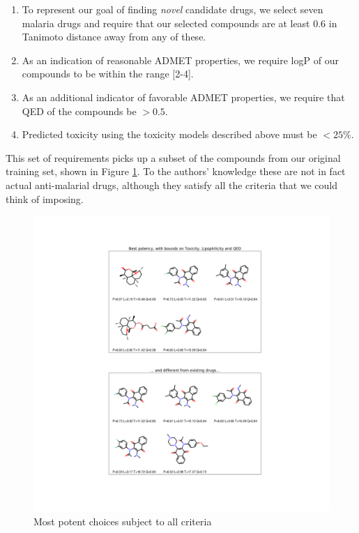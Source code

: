 \documentclass[journal=jacsat,manuscript=article]{achemso}
\begin{document}
\begin{enumerate}
    \item To represent our goal of finding \textit{novel} candidate drugs, we select seven malaria drugs and require that our selected compounds are at least 0.6 in Tanimoto distance away from any of these.
    \item As an indication of reasonable ADMET properties, we require logP of our compounds to be within the range [2-4]\cite{Hansch1971}.
    \item As an additional indicator of favorable ADMET properties, we require that QED of the compounds be $> 0.5$.
    \item Predicted toxicity using the toxicity models described above must be $< 25\%$.
\end{enumerate}

This set of requirements picks up a subset of the compounds from our original training set, shown in Figure \ref{fig:best_in_data}. 
To the authors' knowledge these are not in fact actual anti-malarial drugs, although they satisfy all the criteria that we could think of imposing.


\begin{figure}[h!]
\centering
\includegraphics[width=\textwidth]{fig7.png}
\caption{Most potent choices subject to all criteria}
\label{fig:best_in_data}
\end{figure}
\end{document}

